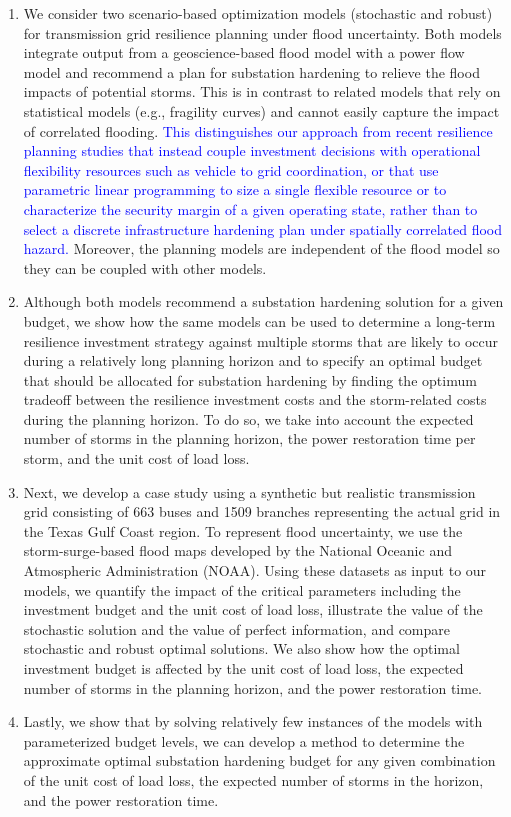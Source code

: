 \documentclass[authoryear,preprint,review,12pt]{elsarticle}\usepackage{amssymb}
\begin{document}
\begin{enumerate}[nosep,noitemsep,leftmargin=0.5cm]
    \item We consider two scenario-based optimization models (stochastic and robust) for transmission grid resilience planning under flood uncertainty. Both models integrate output from a geoscience-based flood model with a power flow model and recommend a plan for substation hardening to relieve the flood impacts of potential storms. This is in contrast to related models that rely on statistical models (e.g., fragility curves) and cannot easily capture the impact of correlated flooding. \textcolor{blue}{This distinguishes our approach from recent resilience planning studies that instead couple investment decisions with operational flexibility resources such as vehicle to grid coordination, or that use parametric linear programming to size a single flexible resource or to characterize the security margin of a given operating state, rather than to select a discrete infrastructure hardening plan under spatially correlated flood hazard.} Moreover, the planning models are independent of the flood model so they can be coupled with other models.
    
    \item Although both models recommend a substation hardening solution for a given budget, we show how the same models can be used to determine a long-term resilience investment strategy against multiple storms that are likely to occur during a relatively long planning horizon and to specify an optimal budget that should be allocated for substation hardening by finding the optimum tradeoff between the resilience investment costs and the storm-related costs during the planning horizon. To do so, we take into account the expected number of storms in the planning horizon, the power restoration time per storm, and the unit cost of load loss.

    \item Next, we develop a case study using a synthetic but realistic transmission grid consisting of 663 buses and 1509 branches representing the actual grid in the Texas Gulf Coast region. To represent flood uncertainty, we use the storm-surge-based flood maps developed by the National Oceanic and Atmospheric Administration (NOAA). Using these datasets as input to our models, we quantify the impact of the critical parameters including the investment budget and the unit cost of load loss, illustrate the value of the stochastic solution and the value of perfect information, and compare stochastic and robust optimal solutions. We also show how the optimal investment budget is affected by the unit cost of load loss, the expected number of storms in the planning horizon, and the power restoration time.

    \item Lastly, we show that by solving relatively few instances of the models with parameterized budget levels, we can develop a method to determine the approximate optimal substation hardening budget for any given combination of the unit cost of load loss, the expected number of storms in the horizon, and the power restoration time.    
\end{enumerate}
\end{document}
